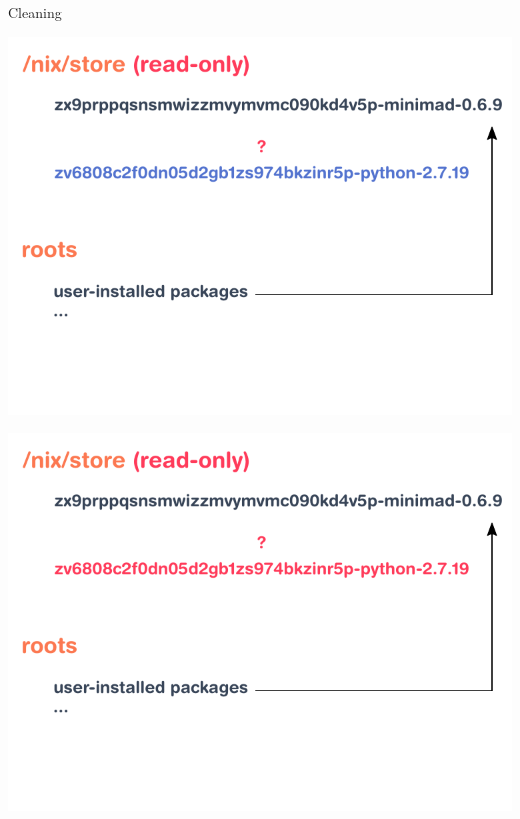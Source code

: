 \documentclass[aspectratio=169]{beamer}
\begin{document}
\begin{frame}{Cleaning}
{\begin{center}
            \includegraphics[height=0.98\textheight]{img/schema-nix-store-gc-2.pdf}
        \end{center}
    }
     {
        \begin{center}
            \includegraphics[height=0.98\textheight]{img/schema-nix-store-gc-3.pdf}
        \end{center}
    }
     {
        \begin{center}

\end{center}}
\end{frame}
\end{document}
